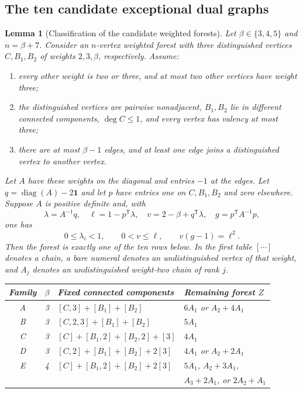 \documentclass[11pt,reqno]{amsart}
\newtheorem{lemma}[lemma]{Lemma}
\theoremstyle{definition}
\theoremstyle{remark}
\numberwithin{equation}{section}
\begin{document}
\subsection{The ten candidate exceptional dual graphs}

\begin{lemma}[Classification of the candidate weighted forests]
\label{lem:ten-forests}
Let $\beta\in\{3,4,5\}$ and $n=\beta+7$.
Consider an $n$-vertex weighted forest with three distinguished vertices
$C,B_1,B_2$ of weights $2,3,\beta$, respectively. Assume:
\begin{enumerate}[label=\textup{(\alph*)}]
\item every other weight is two or three, and at most two other
      vertices have weight three;
\item the distinguished vertices are pairwise nonadjacent,
      $B_1,B_2$ lie in different connected components, $\deg C\le1$,
      and every vertex has valency at most three;
\item there are at most $\beta-1$ edges, and at least one edge joins
      a distinguished vertex to another vertex.
\end{enumerate}
Let $A$ have these weights on the diagonal and entries $-1$ at the
edges. Let $q=\operatorname{diag}(A)-2\mathbf1$ and let $p$ have
entries one on $C,B_1,B_2$ and zero elsewhere. Suppose $A$ is positive
 definite and, with
\[
 \lambda=A^{-1}q,\quad \ell=1-p^{\mathsf T}\lambda,\quad
 v=2-\beta+q^{\mathsf T}\lambda,\quad g=p^{\mathsf T}A^{-1}p,
\]
one has
\[
 0\le\lambda_i<1,\qquad 0<v\le\ell,\qquad v(g-1)=\ell^2.
\]
Then the forest is exactly one of the ten rows below. In the first
 table $[\cdots]$ denotes a chain, a bare numeral denotes an
undistinguished vertex of that weight, and $A_j$ denotes an
undistinguished weight-two chain of rank $j$.
\begin{center}\small
\begin{tabular}{ccll}
\toprule
Family&$\beta$&Fixed connected components&Remaining forest $Z$\\\midrule
A&3&$[C,3]+[B_1]+[B_2]$&$6A_1$ or $A_2+4A_1$\\
B&3&$[C,2,3]+[B_1]+[B_2]$&$5A_1$\\
C&3&$[C]+[B_1,2]+[B_2,2]+[3]$&$4A_1$\\
D&3&$[C,2]+[B_1]+[B_2]+2[3]$&$4A_1$ or $A_2+2A_1$\\
E&4&$[C]+[B_1,2]+[B_2]+2[3]$&$5A_1$, $A_2+3A_1$,\\
 &&&$A_3+2A_1$, or $2A_2+A_1$\\\bottomrule

\end{tabular}
\end{center}
\end{lemma}
\end{document}
